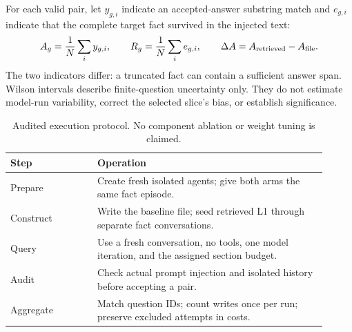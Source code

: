 For each valid pair, let $y_{g,i}$ indicate an accepted-answer substring match
and $e_{g,i}$ indicate that the complete target fact survived in the injected text:
\begin{equation}
 A_g=\frac{1}{N}\sum_i y_{g,i},\qquad
 R_g=\frac{1}{N}\sum_i e_{g,i},\qquad
 \Delta A=A_{\rm retrieved}-A_{\rm file}.
 \label{eq:metrics}
\end{equation}
The two indicators differ: a truncated fact can contain a sufficient answer span.
Wilson intervals describe finite-question uncertainty only. They do not estimate
model-run variability, correct the selected slice's bias, or establish significance.

\begin{table}[htbp]
\centering\small
\caption{Audited execution protocol. No component ablation or weight tuning is claimed.}
\label{tab:protocol}
\begin{tabular}{p{0.25\linewidth}p{0.66\linewidth}}\toprule
Step & Operation \\\midrule
Prepare & Create fresh isolated agents; give both arms the same fact episode. \\
Construct & Write the baseline file; seed retrieved L1 through separate fact conversations. \\
Query & Use a fresh conversation, no tools, one model iteration, and the assigned section budget. \\
Audit & Check actual prompt injection and isolated history before accepting a pair. \\
Aggregate & Match question IDs; count writes once per run; preserve excluded attempts in costs. \\
\bottomrule\end{tabular}\end{table}

\FloatBarrier
